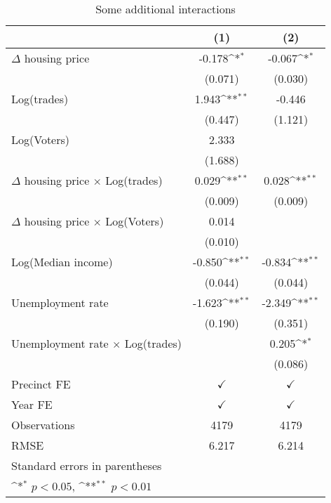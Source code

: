 \begin{table}[htbp]\centering
\def\sym#1{\ifmmode^{#1}\else\(^{#1}\)\fi}
\caption{Some additional interactions} \footnotesize \label{addinter}
\begin{tabular}{l*{2}{c}}
\hline\hline
                    &\multicolumn{1}{c}{(1)}        &\multicolumn{1}{c}{(2)}        \\
\hline
$\Delta$ housing price&      -0.178\sym{*} &      -0.067\sym{*} \\
                    &     (0.071)        &     (0.030)        \\
[1em]
Log(trades)         &       1.943\sym{**}&      -0.446        \\
                    &     (0.447)        &     (1.121)        \\
[1em]
Log(Voters)         &       2.333        &                    \\
                    &     (1.688)        &                    \\
[1em]
$\Delta$ housing price $\times$ Log(trades)&       0.029\sym{**}&       0.028\sym{**}\\
                    &     (0.009)        &     (0.009)        \\
[1em]
$\Delta$ housing price $\times$ Log(Voters)&       0.014        &                    \\
                    &     (0.010)        &                    \\
[1em]
Log(Median income)  &      -0.850\sym{**}&      -0.834\sym{**}\\
                    &     (0.044)        &     (0.044)        \\
[1em]
Unemployment rate   &      -1.623\sym{**}&      -2.349\sym{**}\\
                    &     (0.190)        &     (0.351)        \\
[1em]
Unemployment rate $\times$ Log(trades)&                    &       0.205\sym{*} \\
                    &                    &     (0.086)        \\
[1em]
\hline Precinct FE  &$\checkmark$        &$\checkmark$        \\
[1em]
Year FE             &$\checkmark$        &$\checkmark$        \\
\hline
Observations        &        4179        &        4179        \\
RMSE                &       6.217        &       6.214        \\
\hline\hline
\multicolumn{3}{l}{\footnotesize Standard errors in parentheses}\\
\multicolumn{3}{l}{\footnotesize \sym{*} \(p<0.05\), \sym{**} \(p<0.01\)}\\
\end{tabular}
\end{table}
